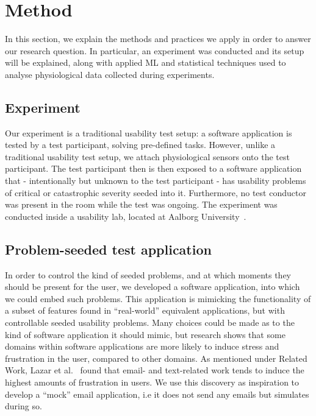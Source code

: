 \section{Method}\label{sec:method}
In this section, we explain the methods and practices we apply in order to answer our research question. In particular, an
experiment was conducted and its setup will be explained, along with applied ML and statistical techniques used to
analyse physiological data collected during experiments.

\subsection{Experiment}
Our experiment is a traditional usability test setup: a software application is tested by a test participant, solving pre-defined tasks. 
However, unlike a traditional usability test setup, we attach physiological sensors onto the test participant.
The test participant then is then exposed to a software application that - intentionally but unknown to the test participant - has usability problems of critical or catastrophic severity seeded into it. 
Furthermore, no test conductor was present in the room while the test was ongoing.
The experiment was conducted inside a usability lab, located at Aalborg University~\cite{usability_lab_cassiopeia}.


\subsection{Problem-seeded test application}
In order to control the kind of seeded problems, and at which moments they should be present for the user, we developed a software
application, into which we could embed such problems. This application is mimicking the functionality of a subset of
features found in ``real-world'' equivalent applications, but with controllable seeded usability problems.  Many choices could be
made as to the kind of software application it should mimic, but research shows that some domains within software
applications are more likely to induce stress and frustration in the user, compared to other domains.  As mentioned
under Related Work, Lazar et al.~\cite{frustration_with_computers} found that email- and text-related work tends to
induce the highest amounts of frustration in users. We use this discovery as inspiration to develop a ``mock'' email
application, i.e it does not send any emails but simulates during so.

